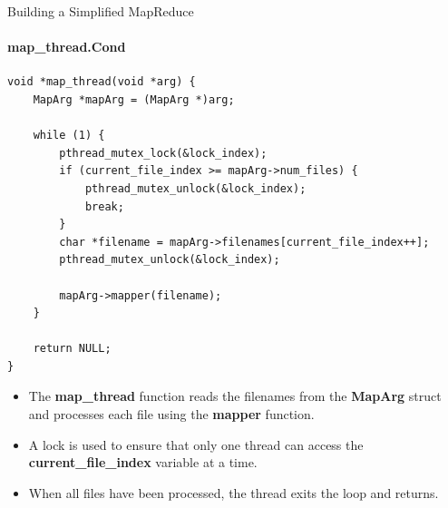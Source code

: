 \documentclass[10pt]{beamer}
\begin{document}
\begin{frame}[fragile]{Building a Simplified MapReduce}
    \framesubtitle{map\_thread.Cond}
    \begin{minipage}{.50\linewidth}
        \begin{lstlisting}
void *map_thread(void *arg) {
    MapArg *mapArg = (MapArg *)arg;

    while (1) {
        pthread_mutex_lock(&lock_index);
        if (current_file_index >= mapArg->num_files) {
            pthread_mutex_unlock(&lock_index);
            break;
        }
        char *filename = mapArg->filenames[current_file_index++];
        pthread_mutex_unlock(&lock_index);

        mapArg->mapper(filename);
    }

    return NULL;
}
                      \end{lstlisting}
    \end{minipage}
    \hspace{13pt}
    \begin{minipage}{.45\linewidth}
        \begin{itemize}
            \item The \textbf{map\_thread} function reads the filenames from the \textbf{MapArg} struct and processes each file using the \textbf{mapper} function.
            \item A lock is used to ensure that only one thread can access the \textbf{current\_file\_index} variable at a time.
            \item When all files have been processed, the thread exits the loop and returns.
        \end{itemize}
    \end{minipage}
\end{frame}
\end{document}

